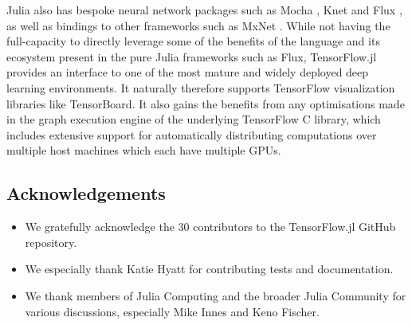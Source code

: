 \documentclass{book}
\begin{document}
Julia also has bespoke neural network packages such as Mocha
\citep{mocha2014}, Knet \citep{knet2016} and Flux \citep{flux}, as
well as bindings to other frameworks such as MxNet \citep{mxnet2015}.
While not having the full-capacity to directly leverage some of the benefits
of the language and its ecosystem present in the pure Julia frameworks
such as Flux, TensorFlow.jl provides an interface to one of the most
mature and widely deployed deep learning environments. It naturally
therefore supports TensorFlow visualization libraries like TensorBoard.
It also gains the benefits from any optimisations made in the graph
execution engine of the underlying TensorFlow C library, which includes
extensive support for automatically distributing computations over
multiple host machines which each have multiple GPUs.

\newpage
\subsection{Acknowledgements}

\begin{itemize}
	\item
	We gratefully acknowledge the 30 contributors to the TensorFlow.jl
	GitHub repository.
	\item
	We especially thank Katie Hyatt for contributing tests and
	documentation.
	\item
	We thank members of Julia Computing and the broader Julia Community
	for various discussions, especially Mike Innes and Keno Fischer.
\end{itemize}
\end{document}

